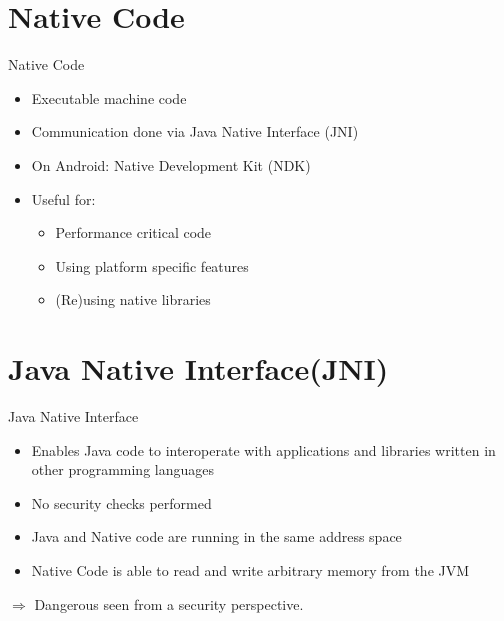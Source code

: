 
\section{Native Code}
\begin{frame}{Native Code}
    \begin{itemize}
    \item Executable machine code
    \item Communication done via Java Native Interface (JNI) \cite{JNISpecChapter1}
    \item On Android: Native Development Kit (NDK) \cite{AndroidNdkIntro}
    \item Useful for:
    \begin{itemize}
    	\item Performance critical code
    	\item Using platform specific features
    	\item (Re)using native libraries
    \end{itemize}
    \end{itemize}
\end{frame}

\section{Java Native Interface(JNI)}
\begin{frame}{Java Native Interface}
    \begin{itemize}
    \item Enables Java code to interoperate with applications and libraries written in other programming languages 
    \item No security checks performed
    \item Java and Native code are running in the same address space
    \item Native Code is able to read and write arbitrary memory from the JVM
    \end{itemize}
    $\Rightarrow$ Dangerous seen from a security perspective.
\end{frame}

